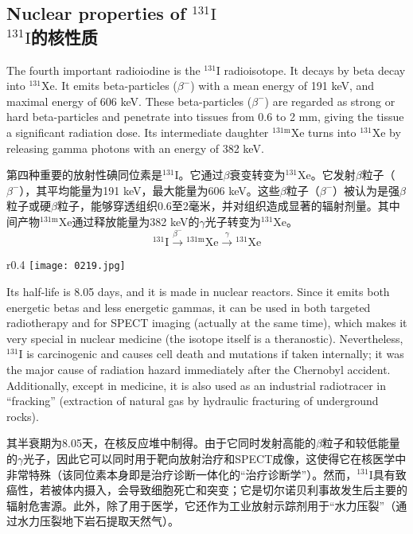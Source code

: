 \documentclass[dvipsnames, svgnames,a4paper,11pt]{article}
\begin{document}
\subsection{Nuclear properties of \(\mathrm{^{131}I}\)\\ \(\mathrm{^{131}I}\)的核性质}  
The fourth important radioiodine is the \(\mathrm{^{131}I}\) radioisotope. It decays by beta decay into \(\mathrm{^{131}Xe}\). It emits beta-particles (\(\beta^-\)) with a mean energy of 191 keV, and maximal energy of 606 keV. These beta-particles (\(\beta^-\)) are regarded as strong or hard beta-particles and penetrate into tissues from 0.6 to 2 mm, giving the tissue a significant radiation dose. Its intermediate daughter \(\mathrm{^{131m}Xe}\) turns into \(\mathrm{^{131}Xe}\) by releasing gamma photons with an energy of 382 keV.

第四种重要的放射性碘同位素是\(\mathrm{^{131}I}\)。它通过\(\beta\)衰变转变为\(\mathrm{^{131}Xe}\)。它发射\(\beta\)粒子（\(\beta^-\)），其平均能量为191 keV，最大能量为606 keV。这些\(\beta\)粒子（\(\beta^-\)）被认为是强\(\beta\)粒子或硬\(\beta\)粒子，能够穿透组织0.6至2毫米，并对组织造成显著的辐射剂量。其中间产物\(\mathrm{^{131m}Xe}\)通过释放能量为382 keV的$\gamma$光子转变为\(\mathrm{^{131}Xe}\)。
\[
\mathrm{^{131}I} \xrightarrow{\beta^-} \mathrm{^{131m}Xe} \xrightarrow{\gamma} \mathrm{^{131}Xe}
\]

\begin{wrapfigure}{r}{0.4\textwidth}
    \centering
    \texttt{[image: 0219.jpg]}
     \label{fig273}
\end{wrapfigure}

Its half-life is 8.05 days, and it is made in nuclear reactors. Since it emits both energetic betas and less energetic gammas, it can be used in both targeted radiotherapy and for SPECT imaging (actually at the same time), which makes it very special in nuclear medicine (the isotope itself is a theranostic). Nevertheless, \(\mathrm{^{131}I}\) is carcinogenic and causes cell death and mutations if taken internally; it was the major cause of radiation hazard immediately after the Chernobyl accident. Additionally, except in medicine, it is also used as an industrial radiotracer in “fracking” (extraction of natural gas by hydraulic fracturing of underground rocks).

其半衰期为8.05天，在核反应堆中制得。由于它同时发射高能的\(\beta\)粒子和较低能量的$\gamma$光子，因此它可以同时用于靶向放射治疗和SPECT成像，这使得它在核医学中非常特殊（该同位素本身即是治疗诊断一体化的“治疗诊断学”）。然而，\(\mathrm{^{131}I}\)具有致癌性，若被体内摄入，会导致细胞死亡和突变；它是切尔诺贝利事故发生后主要的辐射危害源。此外，除了用于医学，它还作为工业放射示踪剂用于“水力压裂”（通过水力压裂地下岩石提取天然气）。
\end{document}
